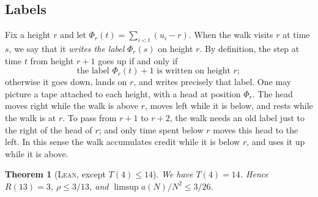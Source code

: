 \documentclass[11pt]{amsart}
\newtheorem{theorem}{Theorem}[section]
\theoremstyle{definition}
\newcommand{\LEAN}{\textsc{Lean}}
\begin{document}
\subsection{Labels}
Fix a height $r$ and let $\Phi_r(t)=\sum_{i<t}(u_i-r)$. When the walk visits $r$ at time $s$, we say that it \emph{writes
the label} $\Phi_r(s)$ on height $r$. By definition, the step at time $t$ from height $r+1$ goes up if and only if
\[
  \text{the label }\Phi_r(t)+1\text{ is written on height }r ;
\]
otherwise it goes down, lands on $r$, and writes precisely that label. One may picture a tape attached to each height, with
a head at position $\Phi_r$. The head moves right while the walk is above $r$, moves left while it is below, and rests while
the walk is at $r$. To pass from $r+1$ to $r+2$, the walk needs an old label just to the right of the head of $r$; and only time spent below $r$ moves this head to the left. In this sense the walk accumulates credit
while it is below $r$, and uses it up while it is above.

\begin{theorem}[\LEAN, except $T(4)\le14$]\label{thm:four}
We have $T(4)=14$. Hence $R(13)=3$, $\rho\le3/13$, and $\limsup a(N)/N^2\le3/26$.
\end{theorem}
\end{document}
